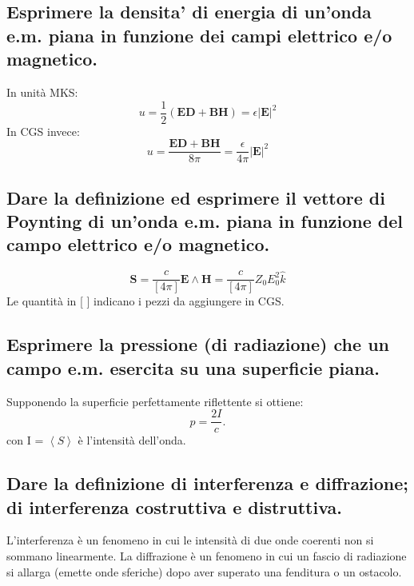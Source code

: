 \subsection[]{ Esprimere la densita’ di energia di un’onda e.m. piana in funzione dei campi elettrico e/o magnetico.}
In unità MKS:
\[
	u = \frac{1}{2} \left( \boldsymbol{E}\boldsymbol{D} + \boldsymbol{B}\boldsymbol{H} \right) = \epsilon |\boldsymbol{E}|^2    
\] 
In CGS invece:
\[
	u = \frac{\boldsymbol{E}\boldsymbol{D} + \boldsymbol{B}\boldsymbol{H}}{8\pi} = \frac{\epsilon}{4\pi} |\boldsymbol{E}|^2 
\]
\subsection[]{ Dare la definizione ed esprimere il vettore di Poynting di un’onda e.m. piana in funzione del campo elettrico e/o magnetico.}
\[
	\boldsymbol{S} = \frac{c}{[4\pi]}\boldsymbol{E} \wedge \boldsymbol{H} = \frac{c}{[4\pi]}Z_{0} E_0^2 \hat{k}     
\] 
Le quantità in [ ] indicano i pezzi da aggiungere in CGS.

\subsection[]{ Esprimere la pressione (di radiazione) che un campo e.m. esercita su una superficie piana.}
Supponendo la superficie perfettamente riflettente si ottiene:
\[
	p = \frac{2I}{c} 
.\] 
con I = $\left<S\right>$ è l'intensità dell'onda. 
\subsection[]{ Dare la definizione di interferenza e diffrazione; di interferenza costruttiva e distruttiva.}
L'interferenza è un fenomeno in cui le intensità di due onde coerenti non si sommano linearmente. La diffrazione è un fenomeno in cui un fascio di radiazione si allarga (emette onde sferiche) dopo aver superato una fenditura o un ostacolo.

